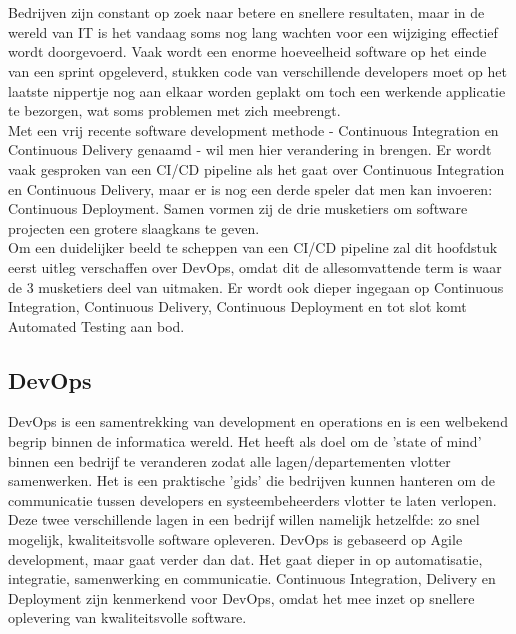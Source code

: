\chapter[Continuous Integration, Delivery \& Deployment]{}
\label{ch:ci-cd-cd}
Bedrijven zijn constant op zoek naar betere en snellere resultaten, maar in de wereld van IT is het vandaag soms nog lang wachten voor een wijziging effectief wordt doorgevoerd. Vaak wordt een enorme hoeveelheid software op het einde van een sprint opgeleverd, stukken code van verschillende developers moet op het laatste nippertje nog aan elkaar worden geplakt om toch een werkende applicatie te bezorgen, wat soms problemen met zich meebrengt.\\
Met een vrij recente software development methode - Continuous Integration en Continuous Delivery genaamd - wil men hier verandering in brengen. Er wordt vaak gesproken van een CI/CD pipeline als het gaat over Continuous Integration en Continuous Delivery, maar er is nog een derde speler dat men kan invoeren: Continuous Deployment. Samen vormen zij de drie musketiers om software projecten een grotere slaagkans te geven.\\
Om een duidelijker beeld te scheppen van een CI/CD pipeline zal dit hoofdstuk eerst uitleg verschaffen over DevOps, omdat dit de allesomvattende term is waar de 3 musketiers deel van uitmaken. Er wordt ook dieper ingegaan op Continuous Integration, Continuous Delivery, Continuous Deployment en tot slot komt Automated Testing aan bod.
        \section{DevOps}
        DevOps is een samentrekking van development en operations en is een welbekend begrip binnen de informatica wereld. Het heeft als doel om de 'state of mind' binnen een bedrijf te veranderen zodat alle lagen/departementen vlotter samenwerken. Het is een praktische 'gids' die bedrijven kunnen hanteren om de communicatie tussen developers en systeembeheerders vlotter te laten verlopen. Deze twee verschillende lagen in een bedrijf willen namelijk hetzelfde: zo snel mogelijk, kwaliteitsvolle software opleveren. DevOps is gebaseerd op Agile development, maar gaat verder dan dat. Het gaat dieper in op automatisatie, integratie, samenwerking en communicatie. 
        Continuous Integration, Delivery en Deployment zijn kenmerkend voor DevOps, omdat het mee inzet op snellere oplevering van kwaliteitsvolle software. ~\autocite{Riti2018}
    

